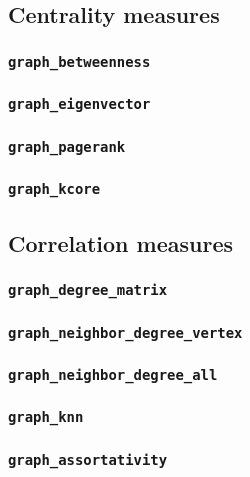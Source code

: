 \subsection{Centrality measures}
\subsubsection{\texttt{graph\_betweenness}}
\subsubsection{\texttt{graph\_eigenvector}}
\subsubsection{\texttt{graph\_pagerank}}
\subsubsection{\texttt{graph\_kcore}}

\subsection{Correlation measures}
\subsubsection{\texttt{graph\_degree\_matrix}}
\subsubsection{\texttt{graph\_neighbor\_degree\_vertex}}
\subsubsection{\texttt{graph\_neighbor\_degree\_all}}
\subsubsection{\texttt{graph\_knn}}
\subsubsection{\texttt{graph\_assortativity}}
